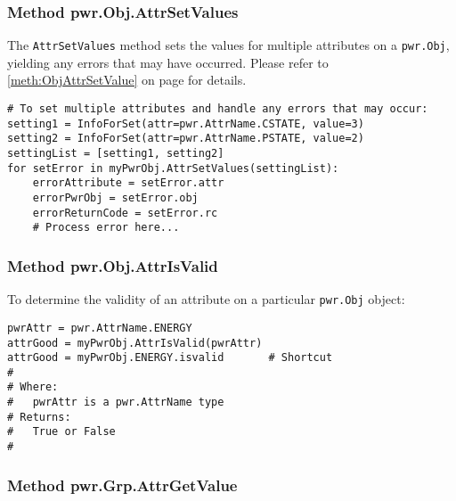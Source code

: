 \subsubsection{Method pwr.Obj.AttrSetValues}
\label{meth:ObjAttrSetValues}

The \texttt{AttrSetValues} method sets the values for multiple attributes on a
\texttt{pwr.Obj}, yielding any errors that may have occurred.
Please refer to
\ref{meth:ObjAttrSetValue} on page \pageref{meth:ObjAttrSetValue} for details.

\begin{center}\begin{minipage}{.95\linewidth}\begin{lstlisting}
# To set multiple attributes and handle any errors that may occur:
setting1 = InfoForSet(attr=pwr.AttrName.CSTATE, value=3)
setting2 = InfoForSet(attr=pwr.AttrName.PSTATE, value=2)
settingList = [setting1, setting2]
for setError in myPwrObj.AttrSetValues(settingList):
    errorAttribute = setError.attr
    errorPwrObj = setError.obj
    errorReturnCode = setError.rc
    # Process error here...
\end{lstlisting}\end{minipage}\end{center}

\subsubsection{Method pwr.Obj.AttrIsValid} \label{meth:ObjAttrIsValid}

To determine the validity of an attribute on a particular \texttt{pwr.Obj}
object:

\begin{center}\begin{minipage}{.95\linewidth}\begin{lstlisting}
pwrAttr = pwr.AttrName.ENERGY
attrGood = myPwrObj.AttrIsValid(pwrAttr)
attrGood = myPwrObj.ENERGY.isvalid       # Shortcut
#
# Where:
#   pwrAttr is a pwr.AttrName type
# Returns:
#   True or False
#
\end{lstlisting}\end{minipage}\end{center}

\subsubsection{Method pwr.Grp.AttrGetValue}
\label{meth:GrpAttrGetValue}

